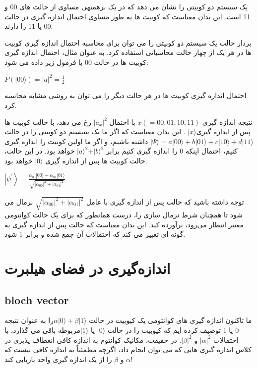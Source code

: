 \documentclass{book}
\begin{document}
یک سیستم دو کوبیتی را نشان می دهد که در یک برهمنهی مساوی از حالت های 00 و 11 است. این بدان معناست که کوبیت ها به طور مساوی احتمال اندازه گیری در حالت 00 یا 11 را دارند.

بردار حالت یک سیستم دو کوبیتی را می توان برای محاسبه احتمال اندازه گیری کوبیت ها در هر یک از چهار حالت محاسباتی استفاده کرد. به عنوان مثال، احتمال اندازه گیری کوبیت ها در حالت 00 با فرمول زیر داده می شود:
\begin{center}
$P(\vert00\rangle) = \vert a\vert^ 2 = \frac{1}{2}$
\end{center}


احتمال اندازه گیری کوبیت ها در هر حالت دیگر را می توان به روشی مشابه محاسبه کرد.

نتیجه اندازه گیری $x (= 00, 01, 10 , 11)$ با احتمال $\vert a_{x} \vert ^ 2$ رخ می دهد، با حالت کوبیت ها پس از اندازه گیری$\vert x \rangle$ . این بدان معناست که اگر ما یک سیستم دو کوبیتی را در حالت
$\vert \Psi \rangle = a \vert00\rangle + b \vert01\rangle + c \vert10\rangle + d \vert11\rangle $ داشته باشیم، و اگر ما اولین کوبیت را اندازه گیری کنیم، احتمال اینکه 0 را اندازه گیری کنیم برابر $\vert a \rangle^2 + \vert b \rangle ^ 2$ خواهد بود. در این حالت، حالت کوبیت ها پس از اندازه گیری $\vert 0 \rangle$ خواهد بود.




\begin{center}
	$\left|\psi^{\prime}\right\rangle=\frac{\alpha_{00}|00\rangle+\alpha_{01}|01\rangle}{\sqrt{\left|\alpha_{00}\right|^2+\left|\alpha_{01}\right|^2}}$
\end{center}
توجه داشته باشید که حالت پس از اندازه گیری با عامل $\sqrt{|{α}_{00}|^2 + |{α}_{01}|^2}$ نرمال می شود
تا همچنان شرط نرمال سازی را، درست همانطور که برای یک
حالت کوانتومی معتبر انتظار می‌‌رود، برآورده کند. این بدان معناست که حالت پس از اندازه گیری به گونه ای تغییر می کند که احتمالات آن جمع شده و برابر 1 شود.

\section{اندازه‌گیری در فضای هیلبرت}
\subsection{bloch vector}
ما تاکنون اندازه گیری های کوانتومی یک کیوبیت در حالت $\alpha\vert0\rangle + \beta\vert1\rangle$را به عنوان نتیجه 0 یا 1 توصیف کرده ایم که کیوبیت را در حالت $\vert 0 \rangle$ یا $\vert 1 \rangle$مربوطه باقی می گذارد، با احتمالات $\vert\alpha\vert ^ 2$ و $\vert\beta\vert ^ 2$. در حقیقت، مکانیک کوانتوم به اندازه کافی انعطاف پذیری در کلاس اندازه گیری هایی که می توان انجام داد، اگرچه مطمئناً به اندازه کافی نیست که $\alpha$ و $\beta$ را از یک اندازه گیری واحد بازیابی کند!
\end{document}
